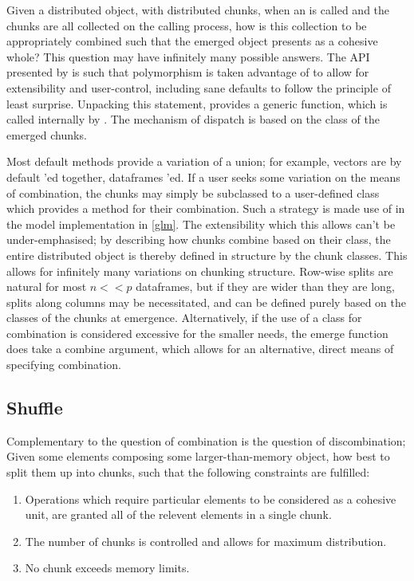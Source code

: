 Given a distributed object, with distributed chunks, when an  is called and the chunks are all collected on the calling process, how is this collection to be appropriately combined such that the emerged object presents as a cohesive whole?
This question may have infinitely many possible answers.
The API presented by \lsr{} is such that polymorphism is taken advantage of to allow for extensibility and user-control, including sane defaults to follow the principle of least surprise.
Unpacking this statement, \lsr{} provides a generic  function, which is called internally by .
The mechanism of dispatch is based on the class of the emerged chunks.

Most default  methods provide a variation of a union; for example, vectors are by default 'ed together, dataframes 'ed.
If a user seeks some variation on the means of combination, the chunks may simply be subclassed to a user-defined class which provides a  method for their combination.
Such a strategy is made use of in the model implementation in \cref{glm}.
The extensibility which this allows can't be under-emphasised; by describing how chunks combine based on their class, the entire distributed object is thereby defined in structure by the chunk classes.
This allows for infinitely many variations on chunking structure.
Row-wise splits are natural for most $n<<p$ dataframes, but if they are wider than they are long, splits along columns may be necessitated, and can be defined purely based on the classes of the chunks at emergence.
Alternatively, if the use of a class for combination is considered excessive for the smaller needs, the emerge function does take a combine argument, which allows for an alternative, direct means of specifying combination.

\subsection{Shuffle}\label{sec:shuffle}

Complementary to the question of combination is the question of discombination;
Given some elements composing some larger-than-memory object, how best to split them up into chunks, such that the following constraints are fulfilled:

\begin{enumerate}
\item Operations which require particular elements to be considered as a cohesive unit, are granted all of the relevent elements in a single chunk.
\item The number of chunks is controlled and allows for maximum distribution.
\item No chunk exceeds memory limits.
\end{enumerate}

